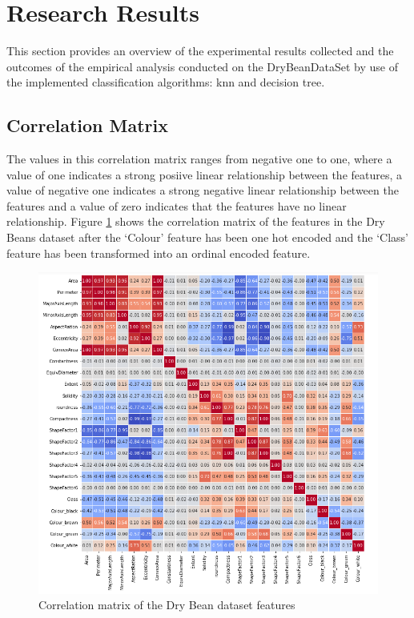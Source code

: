 \documentclass[10pt, conference]{IEEEtran}
\begin{document}
\section{Research Results} \label{section:Research Results}

This section provides an overview of the experimental results collected and the outcomes of the empirical analysis conducted on the
DryBeanDataSet by use of the implemented classification algorithms: \acrshort{knn} and decision tree.

\subsection{Correlation Matrix}

The values in this correlation matrix ranges from negative one to one, where a value of one indicates a strong posiive linear relationship
between the features, a value of negative one indicates a strong negative linear relationship between the features and a value of zero indicates
that the features have no linear relationship. Figure \ref{Correlation_matrix} shows the correlation matrix of the features in the Dry Beans
dataset after the `Colour' feature has been one hot encoded and the `Class' feature has been transformed into an ordinal encoded feature.
\begin{figure}[H]
    \centerline{\includegraphics[scale=0.45]{../Plots/Correlation Matrix.PNG}}
    \caption{Correlation matrix of the Dry Bean dataset features}
    \label{Correlation_matrix}
\end{figure}
\end{document}
